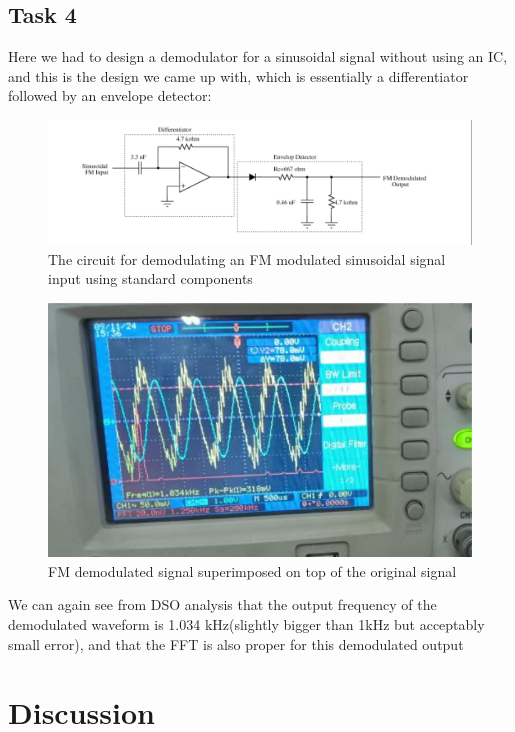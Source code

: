 \documentclass{article}
\begin{document}
\subsection{Task 4}
Here we had to design a demodulator for a sinusoidal signal without using an IC, and this is the design we came up with, which is essentially a differentiator followed by an envelope detector:
\begin{figure}[!ht]
\includegraphics[width=\textwidth]{Demod_2.png}
\caption{The circuit for demodulating an FM modulated sinusoidal signal input using standard components}
\label{fig:cir_2}
\end{figure}

\begin{figure}[!ht]
\includegraphics[width=\textwidth]{Output_sin.png}
\caption{FM demodulated signal superimposed on top of the original signal}
\label{fig:out_sin}
\end{figure}

We can again see from DSO analysis that the output frequency of the demodulated waveform is 1.034 kHz(slightly bigger than 1kHz but acceptably small error), and that the FFT is also proper for this demodulated output
\clearpage
\section{Discussion}
\end{document}
